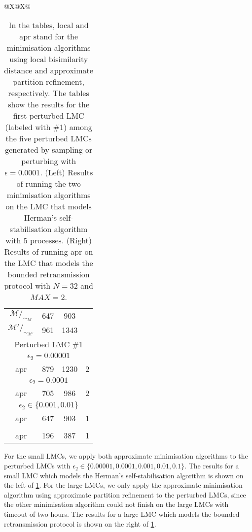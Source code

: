 \documentclass[a4paper,UKenglish,cleveref,autoref,thm-restate]{lipics-v2021}
\newcommand{\M}{\mathcal{M}}
\newcommand{\Hyp}{\mathcal{M}'}%
\begin{document}
\begin{table}[t]
\begin{tabularx}{\textwidth}{@{}X@{}X@{}}
\begin{tabular}{|c|c|c|c|}
		$\M/_{\sim_{\M}}$	&		 		647	  &			903				&\\								
		$\Hyp/_{\sim_{\Hyp}}$     & 		961	   & 	   	  1343        & \\
		\hline
		\multicolumn{4}{|c|}{Perturbed LMC \#1}\\
		\hline
		\multicolumn{4}{|c|}{$\epsilon_2 = 0.00001$}\\
		\hline
		apr		&   879 & 1230 & 2 \\
		\hline
		\multicolumn{4}{|c|}{$\epsilon_2 =  0.0001$}\\
		\hline
		apr		 &  705 & 986 & 2 \\
		\hline
		\multicolumn{4}{|c|}{$\epsilon_2 \in \{0.001, 0.01\}$}\\
		\hline
		\rowcolor{yellow}
		apr		 &  647 & 903 & 1\\
		\rowcolor{white}
		\hline
		\multicolumn{4}{|c|}{$\epsilon_2 = 0.1$}\\
		\hline
		\rowcolor{red!40}
		apr		 & 196  & 387 & 1 \\
		\hline
	\end{tabular}	
\end{tabularx}
\caption{In the tables, local and apr stand for the minimisation algorithms using local bisimilarity distance and approximate partition refinement, respectively. The tables show the results for the first perturbed LMC (labeled with \#1) among the five perturbed LMCs generated by sampling or perturbing with $\epsilon =  0.0001$. (Left) Results of running the two minimisation algorithms on the LMC that models Herman's self-stabilisation algorithm with $5$ processes. (Right) Results of running apr on the LMC that models the bounded retransmission protocol with $N =32$ and $\mathit{MAX} = 2$. } \label{table:results}%
\end{table}



For the small LMCs, we apply both approximate minimisation algorithms to the perturbed LMCs with $\epsilon_2 \in \{0.00001, 0.0001, 0.001, 0.01, 0.1\}$. The results for a small LMC which models the Herman's self-stabilisation algorithm is shown on the left of \cref{table:results}. For the large LMCs, we only apply the approximate minimisation algorithm using approximate partition refinement to the perturbed LMCs, since the other minimisation algorithm could not finish on the large LMCs with timeout of two hours. The results for a large LMC which models the bounded retransmission protocol is shown on the right of \cref{table:results}.   %
\end{document}
